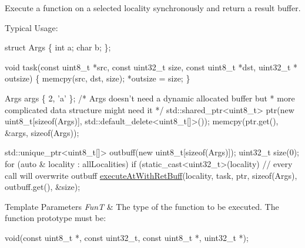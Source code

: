 Execute a function on a selected locality synchronously and return a result buffer. 

Typical Usage\-: 
\begin{DoxyCode}
\textcolor{keyword}{struct }Args \{
  \textcolor{keywordtype}{int} a;
  \textcolor{keywordtype}{char} b;
\};

\textcolor{keywordtype}{void} task(\textcolor{keyword}{const} uint8\_t *src, \textcolor{keyword}{const} uint32\_t size,
          \textcolor{keyword}{const} uint8\_t *dst, uint32\_t * outsize) \{
  memcpy(src, dst, size);
  *outsize = size;
\}

Args args \{ 2, \textcolor{charliteral}{'a'} \};
\textcolor{comment}{/* Args doesn't need a dynamic allocated buffer but}
\textcolor{comment}{ * more complicated data structure might need it */}
std::shared\_ptr<uint8\_t> ptr(\textcolor{keyword}{new} uint8\_t[\textcolor{keyword}{sizeof}(Args)],
                             std::default\_delete<uint8\_t[]>());
memcpy(ptr.get(), &args, \textcolor{keyword}{sizeof}(Args));

std::unique\_ptr<uint8\_t[]> outbuff(\textcolor{keyword}{new} uint8\_t[\textcolor{keyword}{sizeof}(Args)]);
uint32\_t size(0);
\textcolor{keywordflow}{for} (\textcolor{keyword}{auto} & locality : allLocalities)
  \textcolor{keywordflow}{if} (static\_cast<uint32\_t>(locality) %
    \textcolor{comment}{// every call will overwrite outbuff}
    \hyperlink{namespaceshad_1_1rt_acadca86a92a75be85e51534f905b7fef}{executeAtWithRetBuff}(locality, task, ptr, \textcolor{keyword}{sizeof}(Args),
                         outbuff.get(), &size);
\end{DoxyCode}



\begin{DoxyTemplParams}{Template Parameters}
{\em Fun\-T} & The type of the function to be executed. The function prototype must be\-: 
\begin{DoxyCode}
void(\textcolor{keyword}{const} uint8\_t *, \textcolor{keyword}{const} uint32\_t, \textcolor{keyword}{const} uint8\_t *, uint32\_t *);
\end{DoxyCode}
\\
\hline
\end{DoxyTemplParams}

